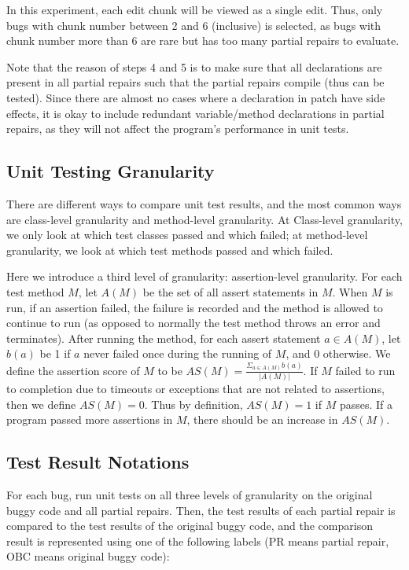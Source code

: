 \documentclass[sigconf, timestamp-false, anonymous=true]{acmart}
\begin{document}
In this experiment, each edit chunk will be viewed as a single edit. Thus, only bugs with chunk number between 2 and 6 (inclusive) is selected, as bugs with chunk number more than 6 are rare but has too many partial repairs to evaluate.

Note that the reason of steps 4 and 5 is to make sure that all declarations are present in all partial repairs such that the partial repairs compile (thus can be tested). Since there are almost no cases where a declaration in patch have side effects, it is okay to include redundant variable/method declarations in partial repairs, as they will not affect the program's performance in unit tests. 

\subsection{Unit Testing Granularity}

There are different ways to compare unit test results, and the most common ways are class-level granularity and method-level granularity. At Class-level granularity, we only look at which test classes passed and which failed; at method-level granularity, we look at which test methods passed and which failed.

Here we introduce a third level of granularity: assertion-level granularity. For each test method $M$, let $A(M)$ be the set of all assert statements in $M$. When $M$ is run, if an assertion failed, the failure is recorded and the method is allowed to continue to run (as opposed to normally the test method throws an error and terminates). After running the method, for each assert statement $a\in A(M)$, let $b(a)$ be 1 if $a$ never failed once during the running of $M$, and 0 otherwise. We define the assertion score of $M$ to be $AS(M)=\frac{\Sigma_{a\in A(M)}b(a)}{|A(M)|}$. If $M$ failed to run to completion due to timeouts or exceptions that are not related to assertions, then we define $AS(M)=0$. Thus by definition, $AS(M)=1$ if $M$ passes. If a program passed more assertions in $M$, there should be an increase in $AS(M)$.

\subsection{Test Result Notations}

For each bug, run unit tests on all three levels of granularity on the original buggy code and all partial repairs. Then, the test results of each partial repair is compared to the test results of the original buggy code, and the comparison result is represented using one of the following labels (PR means partial repair, OBC means original buggy code):
\end{document}
